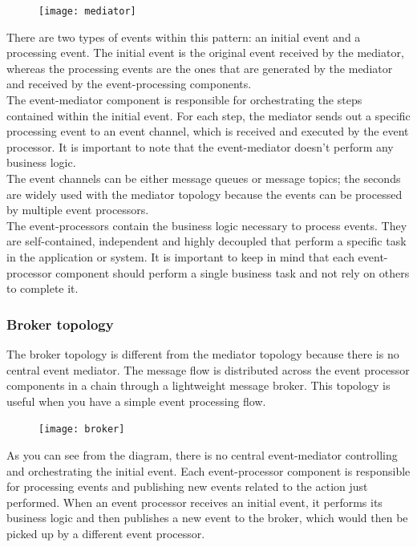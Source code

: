 \documentclass[11pt]{article} %
\begin{document}
\begin{figure} [H]
	\centering
	\texttt{[image: mediator]}
\end{figure}
There are two types of events within this pattern: an initial event and a processing event. The initial event is the original event received by the mediator, whereas the processing events are the ones that are generated by the mediator and received by the event-processing components.\\
The event-mediator component is responsible for orchestrating the steps contained within the initial event. For each step, the mediator sends out a specific processing event to an event channel, which is received and executed by the event processor. It is important to note that the event-mediator doesn't perform any business logic.\\
The event channels can be either message queues or message topics; the seconds are widely used with the mediator topology because the events can be processed by multiple event processors.\\
The event-processors contain the business logic necessary to process events. They are self-contained, independent and highly decoupled that perform a specific task in the application or system. It is important to keep in mind that each event-processor component should perform a single business task and not rely on others to complete it.
\subsubsection{Broker topology}
The broker topology is different from the mediator topology because there is no central event mediator. The message flow is distributed across the event processor components in a chain through a lightweight message broker. This topology is useful when you have a simple event processing flow.

\begin{figure} [H]
	\centering
	\texttt{[image: broker]}
\end{figure}

As you can see from the diagram, there is no central event-mediator controlling and orchestrating the initial event. Each event-processor component is responsible for processing events and publishing new events related to the action just performed. When an event processor receives an initial event, it performs its business logic and then publishes a new event to the broker, which would then be picked up by a different event processor. 
\end{document}
